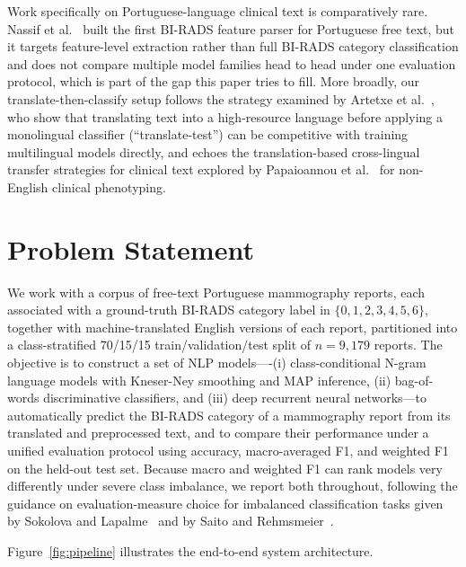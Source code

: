 \documentclass[11pt,a4paper]{article}
\begin{document}
Work specifically on Portuguese-language clinical text is comparatively rare.
Nassif et al.~\cite{nassif2012extracting} built the first BI-RADS feature
parser for Portuguese free text, but it targets feature-level extraction
rather than full BI-RADS category classification and does not compare
multiple model families head to head under one evaluation protocol, which is
part of the gap this paper tries to fill. More broadly, our translate-then-classify
setup follows the strategy examined by Artetxe et al.~\cite{artetxe2023revisiting},
who show that translating text into a high-resource language before applying
a monolingual classifier (``translate-test'') can be competitive with training
multilingual models directly, and echoes the translation-based cross-lingual
transfer strategies for clinical text explored by Papaioannou et
al.~\cite{papaioannou2022cross} for non-English clinical phenotyping.

\section{Problem Statement}

We work with a corpus of free-text Portuguese mammography reports, each
associated with a ground-truth BI-RADS category label in $\{0, 1, 2, 3, 4,
5, 6\}$, together with machine-translated English versions of each report,
partitioned into a class-stratified 70/15/15 train/validation/test split of
$n = 9{,}179$ reports. The objective is to construct a set of NLP
models----(i) class-conditional N-gram language models with Kneser-Ney
smoothing and MAP inference, (ii) bag-of-words discriminative classifiers,
and (iii) deep recurrent neural networks---to automatically predict the
BI-RADS category of a mammography report from its translated and
preprocessed text, and to compare their performance under a unified
evaluation protocol using accuracy, macro-averaged F1, and weighted F1 on
the held-out test set. Because macro and weighted F1 can rank models very
differently under severe class imbalance, we report both throughout,
following the guidance on evaluation-measure choice for imbalanced
classification tasks given by Sokolova and
Lapalme~\cite{sokolova2009systematic} and by Saito and
Rehmsmeier~\cite{saito2015precision}.

Figure~\ref{fig:pipeline} illustrates the end-to-end system architecture.
\end{document}
